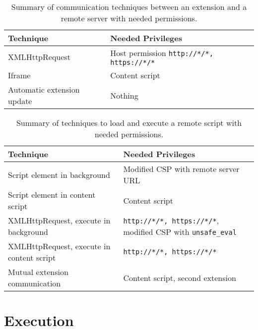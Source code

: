 	\begin{table}[h]
		\centering
		\begin{tabular}{|l|l|} \hline
			\textbf{Technique} & \textbf{Needed Privileges} \\ \hline
			XMLHttpRequest & Host permission \texttt{http://*/*, https://*/*}  \\
			Iframe & Content script \\
			Automatic extension update & Nothing \\ 
			\hline
		\end{tabular}
		\caption{Summary of communication techniques between an extension and a remote server with needed permissions.}
		\label{tab:summaryRemoteCommunication}
	\end{table}

	\begin{table}[h]
		\centering
		\begin{tabular}{|l|l|} \hline
			\textbf{Technique} & \textbf{Needed Privileges} \\ \hline
			Script element in background & Modified CSP with remote server URL \\
			Script element in content script & Content script \\
			XMLHttpRequest, execute in background & \texttt{http://*/*, https://*/*}, modified CSP with \texttt{unsafe\_eval} \\
			XMLHttpRequest, execute in content script & \texttt{http://*/*, https://*/*}  \\
			Mutual extension communication & Content script, second extension \\ 
			\hline
		\end{tabular}
		\caption{Summary of techniques to load and execute a remote script with needed permissions.}
		\label{tab:summaryFetchScript}
	\end{table}
	
	


\clearpage
\section{Execution}
\label{sec:execution}
	

